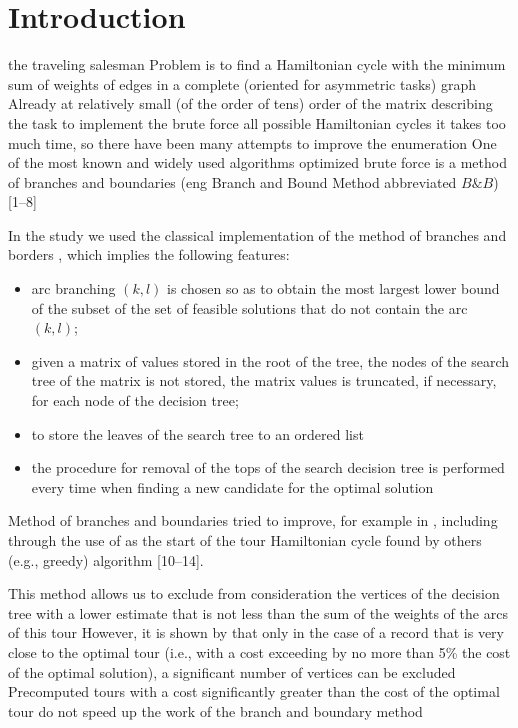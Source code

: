 \documentclass[12pt]{article}
\begin{document}
 
 \section{Introduction} 

 the traveling salesman Problem is to find a Hamiltonian cycle with the minimum sum of weights of edges in a complete (oriented for asymmetric tasks) graph
Already at relatively small (of the order of tens) order of the matrix describing the task to implement the brute force all possible Hamiltonian cycles it takes too much time, so there have been many attempts to improve the enumeration
One of the most known and widely used algorithms optimized brute force is a method of branches and boundaries (eng
Branch and Bound Method abbreviated $B\&B$) [1--8]

 
 
 In the study we used the classical implementation of the method of branches and borders \cite{LMSK}, which implies the following features: 
 \begin{itemize} 
 \item arc branching $(k, l)$ is chosen so as to obtain the most largest lower bound of the subset of the set of feasible solutions that do not contain the arc $(k, l)$; 
 \item given a matrix of values stored in the root of the tree, the nodes of the search tree of the matrix is not stored, the matrix values is truncated, if necessary, for each node of the decision tree; 
 \item to store the leaves of the search tree to an ordered list 
 \item the procedure for removal of the tops of the search decision tree is performed every time when finding a new candidate for the optimal solution

 \end{itemize} 
 
 
 Method of branches and boundaries tried to improve, for example in \cite{Sergeev2013}, including through the use of as the start of the tour Hamiltonian cycle found by others (e.g., greedy) algorithm [10--14]. 
 
 This method allows us to exclude from consideration the vertices of the decision tree with a lower estimate that is not less than the sum of the weights of the arcs of this tour
However, it is shown by \cite{MF} that only in the case of a record that is very close to the optimal tour (i.e.,
with a cost exceeding by no more than 5\% the cost of the optimal solution), a significant number of vertices can be excluded
Precomputed tours with a cost significantly greater than the cost of the optimal tour do not speed up the work of the branch and boundary method
\end{document}
